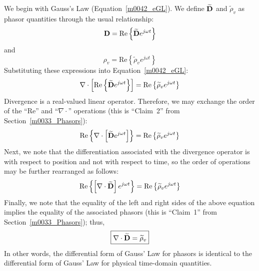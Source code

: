 We begin with Gauss's Law (Equation~\ref{m0042_eGL}).  We define $\widetilde{\bf D}$ and $\widetilde{\rho}_v$ as phasor quantities through the usual relationship:
\begin{equation}   
{\bf D} = \mbox{Re} \left\{  \widetilde{\bf D} e^{j\omega t} \right\}
\end{equation}
%
and
%
\begin{equation}   
\rho_v = \mbox{Re} \left\{ \widetilde{\rho}_v e^{j\omega t} \right\}
\end{equation}
%
Substituting these expressions into Equation~\ref{m0042_eGL}:
\begin{equation}   
\nabla \cdot \left[ \mbox{Re} \left\{  \widetilde{\bf D} e^{j\omega t} \right\} \right] = \mbox{Re} \left\{ \widetilde{\rho}_v e^{j\omega t} \right\}
\end{equation}
%
Divergence is a real-valued linear operator. Therefore, we may exchange the order of the ``Re'' and ``$\nabla\cdot$'' operations (this is ``Claim~2'' from Section~\ref{m0033_Phasors}):
\begin{equation}   
\mbox{Re} \left\{  \nabla \cdot \left[ \widetilde{\bf D} e^{j\omega t}\right] \right\}  = \mbox{Re} \left\{ \widetilde{\rho}_v e^{j\omega t} \right\}
\end{equation}
%
Next, we note that the differentiation associated with the divergence operator is with respect to position and not with respect to time, so the order of operations may be further rearranged as follows:
\begin{equation}   
\mbox{Re} \left\{  \left[ \nabla \cdot  \widetilde{\bf D} \right] e^{j\omega t} \right\}  = \mbox{Re} \left\{ \widetilde{\rho}_v e^{j\omega t} \right\}
\end{equation}
%
Finally, we note that the equality of the left and right sides of the above equation implies the equality of the associated phasors (this is ``Claim~1'' from Section~\ref{m0033_Phasors}); thus,
\begin{equation}
\boxed{   
\nabla \cdot \widetilde{\bf D} = \widetilde{\rho}_v
}
\label{m0042_e1}
\end{equation}
%
In other words, the differential form of Gauss' Law for phasors is identical to the differential form of Gauss' Law for physical time-domain quantities. 

